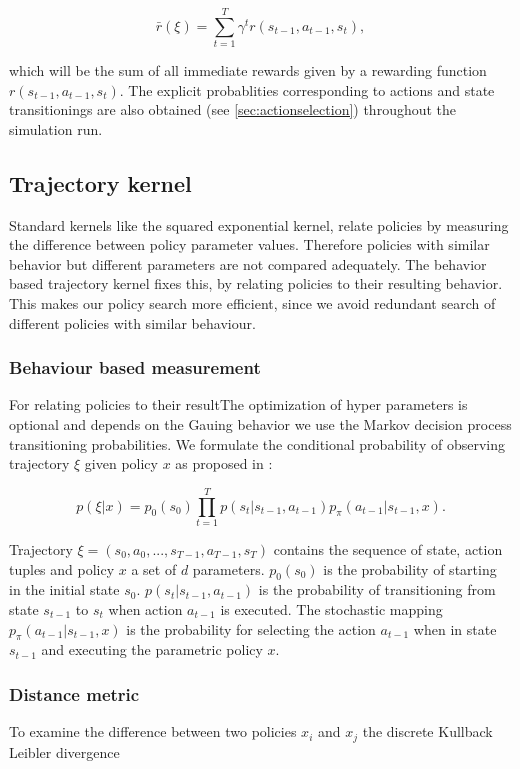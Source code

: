$$\bar{r}(\xi)=\sum_{t=1}^T \gamma^t r(s_{t-1}, a_{t-1}, s_{t}),$$

which will be the sum of all immediate rewards given by a rewarding function $r(s_{t-1}, a_{t-1}, s_{t})$. The explicit probablities corresponding to actions and state transitionings are also obtained (see \ref{sec:actionselection}) throughout the simulation run.

\subsection{Trajectory kernel}\label{sec:trajKernel}
Standard kernels like the squared exponential kernel, relate policies by measuring the difference between policy parameter values. Therefore policies with similar behavior but different parameters are not compared adequately. The behavior based trajectory kernel fixes this, by relating policies to their resulting behavior. This makes our policy search more efficient, since we avoid redundant search of different policies with similar behaviour.

\subsubsection{Behaviour based measurement}

For relating policies to their resultThe optimization of hyper parameters is optional and depends on the Gauing behavior we use the Markov decision process transitioning probabilities. We formulate the conditional probability of observing trajectory $\xi$ given policy $x$ as proposed in \cite{wilson2014using}:

$$p(\xi|x) = p_{0}(s_{0}) \prod_{t=1}^{T} p(s_{t}|s_{t-1}, a_{t-1}) p_{\pi}(a_{t-1}|s_{t-1}, x).$$

Trajectory $\xi=(s_{0},a_{0}, ..., s_{T-1}, a_{T-1}, s_{T})$ contains the sequence of state, action tuples and policy $x$ a set of $d$ parameters. $p_{0}(s_{0})$ is the probability of starting in the initial state $s_{0}$. $p(s_{t}|s_{t-1}, a_{t-1})$ is the probability of transitioning from state $s_{t-1}$ to $s_{t}$ when action $a_{t-1}$ is executed. The stochastic mapping $p_{\pi}(a_{t-1}|s_{t-1},x)$ is the probability for selecting the action $a_{t-1}$ when in state $s_{t-1}$ and executing the parametric policy $x$.

\subsubsection{Distance metric}
To examine the difference between two policies $x_{ i }$ and $x_{ j }$ the discrete Kullback Leibler divergence

